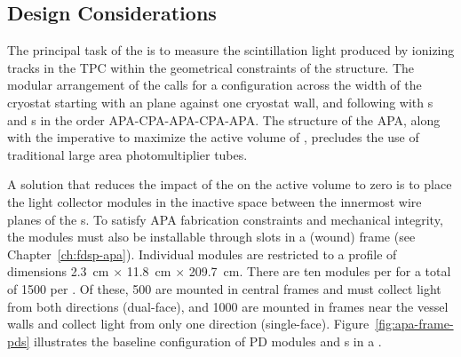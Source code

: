 \subsection{Design Considerations}
\label{sec:fdsp-pd-des-consid}

The principal task of the   is to measure the  scintillation light produced by ionizing tracks in the TPC within the geometrical constraints of the  structure. The modular arrangement of the  calls for a configuration across the width of the cryostat starting with an  plane against one cryostat wall, and following with s and s in the order  APA-CPA-APA-CPA-APA.
The structure of the APA, along with the imperative to maximize the active volume of , precludes the use of traditional large area photomultiplier tubes.  

A solution that reduces the impact of the  on the active volume to zero is to place the light collector modules in the inactive space between the innermost wire planes of the s. To satisfy APA fabrication constraints and mechanical integrity, the modules must also be installable through slots in a (wound)  frame (see Chapter~\ref{ch:fdsp-apa}).  Individual  modules are restricted to a profile of dimensions \SI{2.3}{cm} $\times$ \SI{11.8}{cm} $\times$ \SI{209.7}{cm}.  There are ten  modules per  for a total of \num{1500} per .  Of these, \num{500} are mounted in central  frames and must collect light from both directions (dual-face), and \num{1000} are mounted in frames  near the vessel walls and collect light from only one direction (single-face).
Figure~\ref{fig:apa-frame-pds} illustrates the baseline configuration of PD modules and s in a . 



